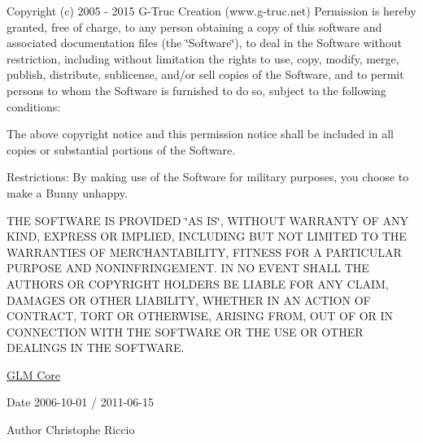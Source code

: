 Copyright (c) 2005 -\/ 2015 G-\/\-Truc Creation (www.\-g-\/truc.\-net) Permission is hereby granted, free of charge, to any person obtaining a copy of this software and associated documentation files (the \char`\"{}\-Software\char`\"{}), to deal in the Software without restriction, including without limitation the rights to use, copy, modify, merge, publish, distribute, sublicense, and/or sell copies of the Software, and to permit persons to whom the Software is furnished to do so, subject to the following conditions\-:

The above copyright notice and this permission notice shall be included in all copies or substantial portions of the Software.

Restrictions\-: By making use of the Software for military purposes, you choose to make a Bunny unhappy.

T\-H\-E S\-O\-F\-T\-W\-A\-R\-E I\-S P\-R\-O\-V\-I\-D\-E\-D \char`\"{}\-A\-S I\-S\char`\"{}, W\-I\-T\-H\-O\-U\-T W\-A\-R\-R\-A\-N\-T\-Y O\-F A\-N\-Y K\-I\-N\-D, E\-X\-P\-R\-E\-S\-S O\-R I\-M\-P\-L\-I\-E\-D, I\-N\-C\-L\-U\-D\-I\-N\-G B\-U\-T N\-O\-T L\-I\-M\-I\-T\-E\-D T\-O T\-H\-E W\-A\-R\-R\-A\-N\-T\-I\-E\-S O\-F M\-E\-R\-C\-H\-A\-N\-T\-A\-B\-I\-L\-I\-T\-Y, F\-I\-T\-N\-E\-S\-S F\-O\-R A P\-A\-R\-T\-I\-C\-U\-L\-A\-R P\-U\-R\-P\-O\-S\-E A\-N\-D N\-O\-N\-I\-N\-F\-R\-I\-N\-G\-E\-M\-E\-N\-T. I\-N N\-O E\-V\-E\-N\-T S\-H\-A\-L\-L T\-H\-E A\-U\-T\-H\-O\-R\-S O\-R C\-O\-P\-Y\-R\-I\-G\-H\-T H\-O\-L\-D\-E\-R\-S B\-E L\-I\-A\-B\-L\-E F\-O\-R A\-N\-Y C\-L\-A\-I\-M, D\-A\-M\-A\-G\-E\-S O\-R O\-T\-H\-E\-R L\-I\-A\-B\-I\-L\-I\-T\-Y, W\-H\-E\-T\-H\-E\-R I\-N A\-N A\-C\-T\-I\-O\-N O\-F C\-O\-N\-T\-R\-A\-C\-T, T\-O\-R\-T O\-R O\-T\-H\-E\-R\-W\-I\-S\-E, A\-R\-I\-S\-I\-N\-G F\-R\-O\-M, O\-U\-T O\-F O\-R I\-N C\-O\-N\-N\-E\-C\-T\-I\-O\-N W\-I\-T\-H T\-H\-E S\-O\-F\-T\-W\-A\-R\-E O\-R T\-H\-E U\-S\-E O\-R O\-T\-H\-E\-R D\-E\-A\-L\-I\-N\-G\-S I\-N T\-H\-E S\-O\-F\-T\-W\-A\-R\-E.

\hyperlink{group__core}{G\-L\-M Core}

\begin{DoxyDate}{Date}
2006-\/10-\/01 / 2011-\/06-\/15 
\end{DoxyDate}
\begin{DoxyAuthor}{Author}
Christophe Riccio 
\end{DoxyAuthor}
